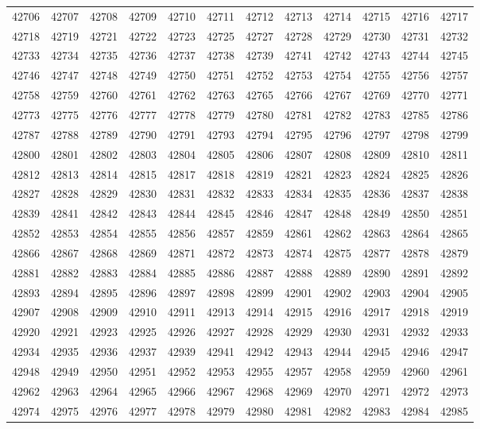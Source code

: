 \begin{center}
\begin{longtable}{llllllllllll}
42706 &42707 &42708 &42709 &42710 &42711 &42712 &42713 &42714 &42715 &42716 &42717 \\
42718 &42719 &42721 &42722 &42723 &42725 &42727 &42728 &42729 &42730 &42731 &42732 \\
42733 &42734 &42735 &42736 &42737 &42738 &42739 &42741 &42742 &42743 &42744 &42745 \\
42746 &42747 &42748 &42749 &42750 &42751 &42752 &42753 &42754 &42755 &42756 &42757 \\
42758 &42759 &42760 &42761 &42762 &42763 &42765 &42766 &42767 &42769 &42770 &42771 \\
42773 &42775 &42776 &42777 &42778 &42779 &42780 &42781 &42782 &42783 &42785 &42786 \\
42787 &42788 &42789 &42790 &42791 &42793 &42794 &42795 &42796 &42797 &42798 &42799 \\
42800 &42801 &42802 &42803 &42804 &42805 &42806 &42807 &42808 &42809 &42810 &42811 \\
42812 &42813 &42814 &42815 &42817 &42818 &42819 &42821 &42823 &42824 &42825 &42826 \\
42827 &42828 &42829 &42830 &42831 &42832 &42833 &42834 &42835 &42836 &42837 &42838 \\
42839 &42841 &42842 &42843 &42844 &42845 &42846 &42847 &42848 &42849 &42850 &42851 \\
42852 &42853 &42854 &42855 &42856 &42857 &42859 &42861 &42862 &42863 &42864 &42865 \\
42866 &42867 &42868 &42869 &42871 &42872 &42873 &42874 &42875 &42877 &42878 &42879 \\
42881 &42882 &42883 &42884 &42885 &42886 &42887 &42888 &42889 &42890 &42891 &42892 \\
42893 &42894 &42895 &42896 &42897 &42898 &42899 &42901 &42902 &42903 &42904 &42905 \\
42907 &42908 &42909 &42910 &42911 &42913 &42914 &42915 &42916 &42917 &42918 &42919 \\
42920 &42921 &42923 &42925 &42926 &42927 &42928 &42929 &42930 &42931 &42932 &42933 \\
42934 &42935 &42936 &42937 &42939 &42941 &42942 &42943 &42944 &42945 &42946 &42947 \\
42948 &42949 &42950 &42951 &42952 &42953 &42955 &42957 &42958 &42959 &42960 &42961 \\
42962 &42963 &42964 &42965 &42966 &42967 &42968 &42969 &42970 &42971 &42972 &42973 \\
42974 &42975 &42976 &42977 &42978 &42979 &42980 &42981 &42982 &42983 &42984 &42985 \\

\end{longtable}
\end{center}
